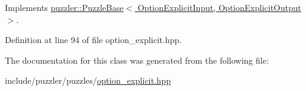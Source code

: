 Implements \hyperlink{a00027_aed67f6b074b18cbf20019928acc65f26}{puzzler\+::\+Puzzle\+Base$<$ Option\+Explicit\+Input, Option\+Explicit\+Output $>$}.



Definition at line 94 of file option\+\_\+explicit.\+hpp.



The documentation for this class was generated from the following file\+:\begin{DoxyCompactItemize}
\item 
include/puzzler/puzzles/\hyperlink{a00132}{option\+\_\+explicit.\+hpp}\end{DoxyCompactItemize}
